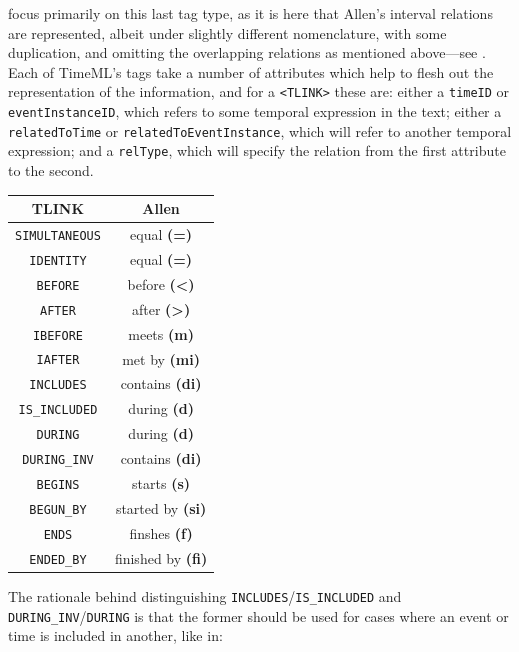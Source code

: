 \documentclass[a4paper,12pt,leqno]{article}
\begin{document}
 focus primarily on this last tag type, as it is here that Allen's interval relations are represented, albeit under slightly different nomenclature, with some duplication, and omitting the overlapping relations as mentioned above---see . Each of TimeML's tags take a number of attributes which help to flesh out the representation of the information, and for a \verb|<TLINK>| these are: either a \texttt{timeID} or \texttt{event\allowbreak{}InstanceID}, which refers to some temporal expression in the text; either a \texttt{relatedTo\allowbreak{}Time} or \texttt{relatedTo\allowbreak{}Event\allowbreak{}Instance}, which will refer to another temporal expression; and a \texttt{relType}, which will specify the relation from the first attribute to the second.
\begin{center}
	\begin{tabular}[h!]{|c c|}
		\hline
		\textbf{TLINK} & \textbf{Allen}\\
		\hline
		\texttt{SIMULTANEOUS} & equal \textbf{(=)}\\
		\texttt{IDENTITY} & equal \textbf{(=)}\\
		\texttt{BEFORE} & before \textbf{(\textless{})}\\
		\texttt{AFTER} & after \textbf{(\textgreater{})}\\
		\texttt{IBEFORE} & meets \textbf{(m)}\\
		\texttt{IAFTER} & met by \textbf{(mi)}\\
		\texttt{INCLUDES} & contains \textbf{(di)}\\
		\texttt{IS\_INCLUDED} & during \textbf{(d)}\\
		\texttt{DURING} & during \textbf{(d)}\\
		\texttt{DURING\_INV} & contains \textbf{(di)}\\
		\texttt{BEGINS} & starts \textbf{(s)}\\
		\texttt{BEGUN\_BY} & started by \textbf{(si)}\\
		\texttt{ENDS} & finshes \textbf{(f)}\\
		\texttt{ENDED\_BY} & finished by \textbf{(fi)}\\
		\hline
	\end{tabular}
	\label{fig:tlink-allen-translation}
\end{center}
The rationale behind distinguishing \texttt{INCLUDES}/\texttt{IS\_INCLUDED} and \texttt{DURING\_INV}/\texttt{DURING} is that the former should be used for cases where an event or time is included in another, like in:
\end{document}
